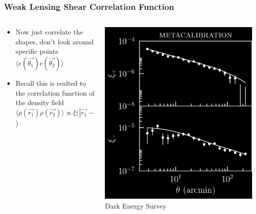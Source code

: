 \documentclass{beamer}
\begin{document}
\frame
{

    \frametitle{Weak Lensing Shear Correlation Function}


    \begin{columns}
        \begin{column}{0.5\textwidth}
            \begin{itemize}

                \item Now just correlate the shapes, don't look around
                    specific points {\color{gold} $\langle e(\vec{\theta_1})
                    e(\vec{\theta_2}) \rangle$ }

                \item Recall this is realted to the correlation function
                    of the density field
                    {\color{gold} $\langle \rho(\vec{r_1}) \rho(\vec{r_2})
                    \rangle \propto \xi(|\vec{r_1} - \vec{r_2}|$) }

            \end{itemize}

        \end{column}
        \begin{column}{0.5\textwidth}
            \begin{center}
                \includegraphics[width=\textwidth]{xi_notomo_neg.png}
                \newline
                {\tiny Dark Energy Survey}
            \end{center}
        \end{column}

    \end{columns}


}
\end{document}
